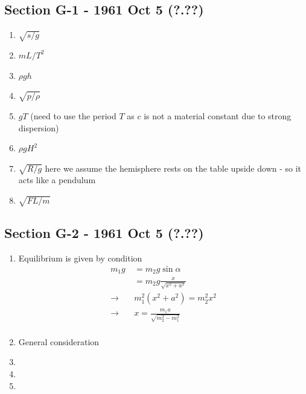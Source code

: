 \documentclass[../main.tex]{subfiles}
\begin{document}
\subsection{Section G-1 - 1961 Oct 5 (?.??)}
\begin{enumerate}[label=(\alph*)]
    \item $\sqrt{s/g}$
    \item $mL/T^2$
    \item $\rho g h$
    \item $\sqrt{p/\rho}$
    \item $gT$ (need to use the period $T$ as $c$ is not a material constant due to strong dispersion)
    \item $\rho g H^2$
    \item $\sqrt{R/g}$ here we assume the hemisphere rests on the table upside down - so it acts like a pendulum 
    \item $\sqrt{FL/m}$
\end{enumerate}

\subsection{Section G-2 - 1961 Oct 5 (?.??)}
\begin{enumerate}
    \item Equilibrium is given by condition
    \begin{align}
        m_1g&=m_2g\sin\alpha\\
        &=m_2g\frac{x}{\sqrt{x^2+a^2}}\\
        \rightarrow\quad& m_1^2(x^2+a^2)=m_2^2 x^2\\
        \rightarrow\quad& x=\frac{m_1 a}{\sqrt{m_2^2-m_1^2}}\\
    \end{align}
    \item General consideration
    \begin{center}
    \end{center}
    
    \item
    \item
    \item
\end{enumerate}
\end{document}
